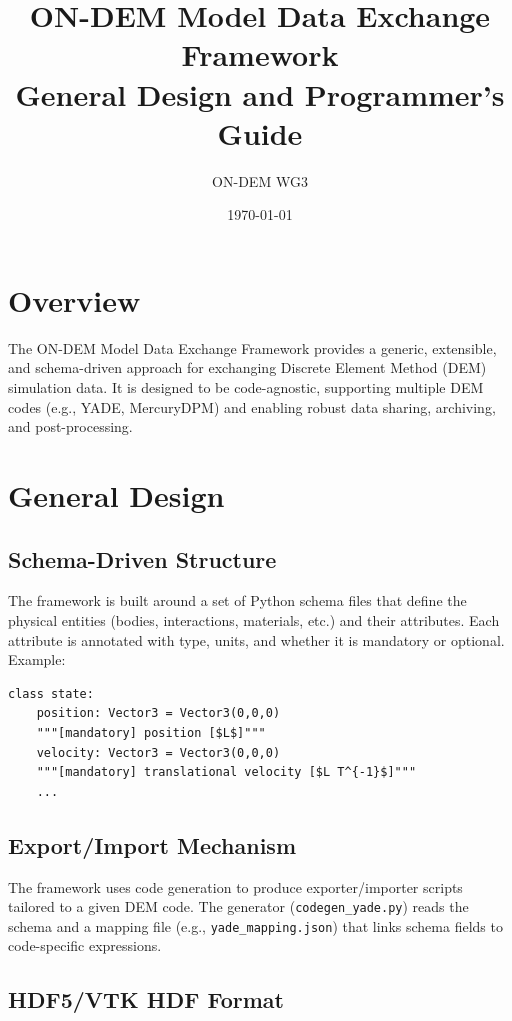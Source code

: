 \documentclass[11pt]{article}
\title{ON-DEM Model Data Exchange Framework\\
\vspace{0.5em}
\large General Design and Programmer's Guide}
\author{ON-DEM WG3}
\date{\today}
\begin{document}
\maketitle

\section{Overview}

The ON-DEM Model Data Exchange Framework provides a generic, extensible, and schema-driven approach for exchanging Discrete Element Method (DEM) simulation data. It is designed to be code-agnostic, supporting multiple DEM codes (e.g., YADE, MercuryDPM) and enabling robust data sharing, archiving, and post-processing.

\section{General Design}

\subsection{Schema-Driven Structure}

The framework is built around a set of Python schema files that define the physical entities (bodies, interactions, materials, etc.) and their attributes. Each attribute is annotated with type, units, and whether it is mandatory or optional. Example:

\begin{verbatim}
class state:
    position: Vector3 = Vector3(0,0,0)
    """[mandatory] position [$L$]"""
    velocity: Vector3 = Vector3(0,0,0)
    """[mandatory] translational velocity [$L T^{-1}$]"""
    ...
\end{verbatim}

\subsection{Export/Import Mechanism}

The framework uses code generation to produce exporter/importer scripts tailored to a given DEM code. The generator (\texttt{codegen\_yade.py}) reads the schema and a mapping file (e.g., \texttt{yade\_mapping.json}) that links schema fields to code-specific expressions.

\subsection{HDF5/VTK HDF Format}
\end{document}

